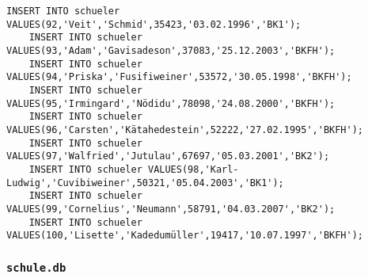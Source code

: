 \begin{lstlisting}[breaklines=True, numbers=none, basicstyle=\tiny, keepspaces=false]
	INSERT INTO schueler VALUES(92,'Veit','Schmid',35423,'03.02.1996','BK1');
	INSERT INTO schueler VALUES(93,'Adam','Gavisadeson',37083,'25.12.2003','BKFH');
	INSERT INTO schueler VALUES(94,'Priska','Fusifiweiner',53572,'30.05.1998','BKFH');
	INSERT INTO schueler VALUES(95,'Irmingard','Nödidu',78098,'24.08.2000','BKFH');
	INSERT INTO schueler VALUES(96,'Carsten','Kätahedestein',52222,'27.02.1995','BKFH');
	INSERT INTO schueler VALUES(97,'Walfried','Jutulau',67697,'05.03.2001','BK2');
	INSERT INTO schueler VALUES(98,'Karl-Ludwig','Cuvibiweiner',50321,'05.04.2003','BK1');
	INSERT INTO schueler VALUES(99,'Cornelius','Neumann',58791,'04.03.2007','BK2');
	INSERT INTO schueler VALUES(100,'Lisette','Kadedumüller',19417,'10.07.1997','BKFH');
\end{lstlisting}
\subsubsection{\lstinline!schule.db!}
